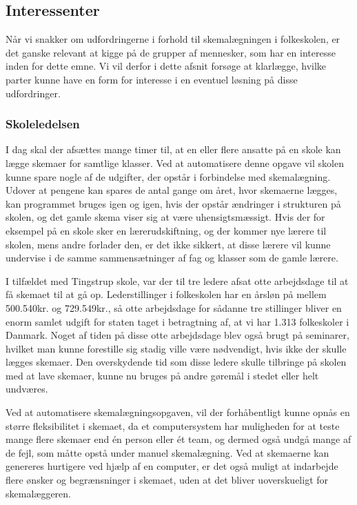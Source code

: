 \subsection{Interessenter}
Når vi snakker om udfordringerne i forhold til skemalægningen i folkeskolen, er det ganske relevant at kigge på de grupper af mennesker, som har en interesse inden for dette emne. Vi vil derfor i dette afsnit forsøge at klarlægge, hvilke parter kunne have en form for interesse i en eventuel løsning på disse udfordringer.

\subsubsection{Skoleledelsen}
I dag skal der afsættes mange timer til, at en eller flere ansatte på en skole kan lægge skemaer for samtlige klasser. Ved at automatisere denne opgave vil skolen kunne spare nogle af de udgifter, der opstår i forbindelse med skemalægning. Udover at pengene kan spares de antal gange om året, hvor skemaerne lægges, kan programmet bruges igen og igen, hvis der opstår ændringer i strukturen på skolen, og det gamle skema viser sig at være uhensigtsmæssigt. Hvis der for eksempel på en skole sker en lærerudskiftning, og der kommer nye lærere til skolen, mens andre forlader den, er det ikke sikkert, at disse lærere vil kunne undervise i de samme sammensætninger af fag og klasser som de gamle lærere.

I tilfældet med Tingstrup skole, var der til tre ledere afsat otte arbejdsdage til at få skemaet til at gå op. Lederstillinger i folkeskolen har en årsløn på mellem 500.540kr. og 729.549kr.\cite{TR_HAANDBOGEN, Statens_adm}, så otte arbejdsdage for sådanne tre stillinger bliver en enorm samlet udgift for staten taget i betragtning af, at vi har 1.313 folkeskoler i Danmark\cite{UVM-Folkeskoler}. Noget af tiden på disse otte arbejdsdage blev også brugt på seminarer, hvilket man kunne forestille sig stadig ville være nødvendigt, hvis ikke der skulle lægges skemaer. Den overskydende tid som disse ledere skulle tilbringe på skolen med at lave skemaer, kunne nu bruges på andre gøremål i stedet eller helt undværes.

Ved at automatisere skemalægningsopgaven, vil der forhåbentligt kunne opnås en større fleksibilitet i skemaet, da et computersystem har muligheden for at teste mange flere skemaer end \'en person eller \'et team, og dermed også undgå mange af de fejl, som måtte opstå under manuel skemalægning. Ved at skemaerne kan genereres hurtigere ved hjælp af en computer, er det også muligt at indarbejde flere ønsker og begrænsninger i skemaet, uden at det bliver uoverskueligt for skemalæggeren. 

